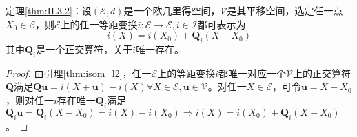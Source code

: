 \documentclass[main.tex]{subfiles}
\begin{document}
\begin{theorem*}[等距变换的表示定理]
    定理\ref{thm:II.3.2}：设$\left(\mathcal{E},d\right)$是一个欧几里得空间，$\mathcal{V}$是其平移空间，选定任一点$X_0\in\mathcal{E}$，则$\mathcal{E}$上的任一等距变换$i:\mathcal{E}\rightarrow\mathcal{E},i\in\mathcal{I}$都可表示为
    \[
        i\left(X\right)=i\left(X_0\right)+\mathbf{Q}_i\left(X-X_0\right)
    \]
    其中$\mathbf{Q}_i$是一个正交算符，关于$i$唯一存在。
\end{theorem*}
\begin{proof}
    由引理\ref{thm:isom_l2}，任一$\mathcal{E}$上的等距变换$i$都唯一对应一个$\mathcal{V}$上的正交算符$\mathbf{Q}$满足$\mathbf{Qu}=i\left(X+\mathbf{u}\right)-i\left(X\right)\forall X\in\mathcal{E},\mathbf{u}\in\mathcal{V}$。对任一$X\in\mathcal{E}$，可令$\mathbf{u}=X-X_0$，则对任一$i$存在唯一$\mathbf{Q}_i$满足$\mathbf{Q}_i\mathbf{u}=\mathbf{Q}_i\left(X-X_0\right)=i\left(X\right)-i\left(X_0\right)\Rightarrow i\left(X\right)=i\left(X_0\right)+\mathbf{Q}_i\left(X-X_0\right)$。
\end{proof}
\end{document}
